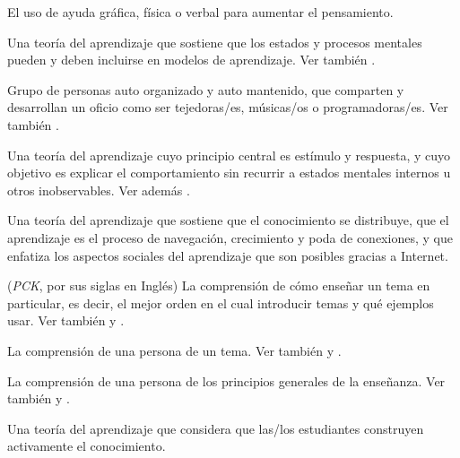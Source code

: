 \begin{description}
 El uso de ayuda gráfica,
física o verbal para aumentar el pensamiento.

 Una teoría del aprendizaje que sostiene que los estados 
y procesos mentales pueden y deben incluirse en modelos de aprendizaje. Ver también
.

 Grupo de personas auto organizado y auto mantenido,
que comparten y desarrollan un oficio como ser tejedoras/es, músicas/os o programadoras/es. Ver también
.

 Una teoría del aprendizaje cuyo principio central
es estímulo y respuesta, y cuyo objetivo es explicar el comportamiento sin recurrir
a estados mentales internos u otros inobservables. Ver
además .

 Una teoría del aprendizaje que sostiene que el conocimiento se distribuye,
que el aprendizaje es el proceso de navegación, crecimiento y poda de conexiones, y que enfatiza los aspectos
sociales del aprendizaje que son posibles gracias a Internet.

 (\emph{PCK}, por sus siglas en Inglés) 
La comprensión de cómo enseñar un tema en particular, es decir, el mejor orden en el cual introducir temas y qué ejemplos usar. 
Ver también 
y .

 La comprensión de una
persona de un tema. Ver también
y .

 La
comprensión de una persona de los principios generales de la enseñanza. Ver también
y .

 Una teoría del aprendizaje que considera que
las/los estudiantes construyen activamente el conocimiento.


\end{description}

